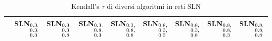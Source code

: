 \begin{table}[!htbp]
    \caption{Kendall's $\tau$ di diversi algoritmi in reti SLN}
    \label{tab:tausln}
    \centering
    \begin{tabular}{lrrrrrrrr}
        \toprule
          & SLN$_{\begin{subarray}{l} 0.3\text{,} \\ 0.3\text{,} \\ 0.3 \end{subarray}}$ 
          & SLN$_{\begin{subarray}{l} 0.3\text{,} \\ 0.3\text{,} \\ 0.8 \end{subarray}}$ 
          & SLN$_{\begin{subarray}{l} 0.3\text{,} \\ 0.8\text{,} \\ 0.3 \end{subarray}}$ 
          & SLN$_{\begin{subarray}{l} 0.3\text{,} \\ 0.8\text{,} \\ 0.8 \end{subarray}}$ 
          & SLN$_{\begin{subarray}{l} 0.8\text{,} \\ 0.3\text{,} \\ 0.3 \end{subarray}}$ 
          & SLN$_{\begin{subarray}{l} 0.8\text{,} \\ 0.3\text{,} \\ 0.8 \end{subarray}}$ 
          & SLN$_{\begin{subarray}{l} 0.8\text{,} \\ 0.8\text{,} \\ 0.3 \end{subarray}}$ 
          & SLN$_{\begin{subarray}{l} 0.8\text{,} \\ 0.8\text{,} \\ 0.8 \end{subarray}}$ \\
        \midrule

\end{tabular}
\end{table}

